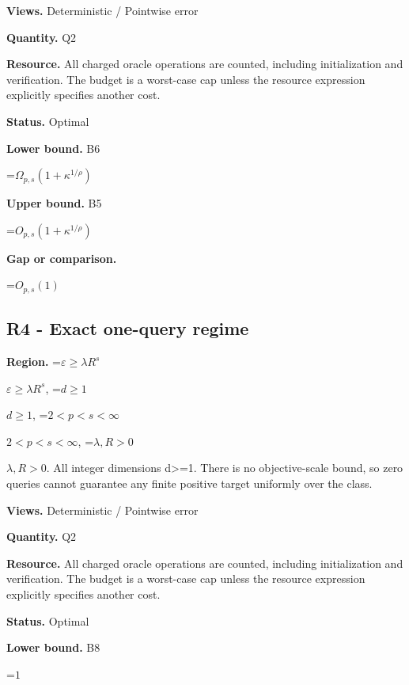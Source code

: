 \documentclass[10pt,a4paper]{article}
\newcommand{\AtlasMath}[1]{\par\begingroup\centering\setbox0=\hbox{$\displaystyle #1$}\ifdim\wd0>1.4\linewidth\typeout{ATLAS WIDE FORMULA: \the\wd0}\fi\ifdim\wd0>\linewidth\resizebox{\linewidth}{!}{\box0}\else\box0\fi\par\endgroup}
\newcommand{\AtlasInlineMath}[1]{\begingroup\setbox0=\hbox{$#1$}\ifdim\wd0>.4\linewidth\endgroup\AtlasMath{#1}\else\endgroup$#1$\fi}
\begin{document}
\textbf{Views.} Deterministic / Pointwise error



\textbf{Quantity.} Q2



\textbf{Resource.} All charged oracle operations are counted, including initialization and verification. The budget is a worst-case cap unless the resource expression explicitly specifies another cost.



\textbf{Status.} Optimal



\textbf{Lower bound.} B6



\AtlasMath{\Omega_{p,s}(1+\kappa^{1/\rho})}


\textbf{Upper bound.} B5



\AtlasMath{O_{p,s}(1+\kappa^{1/\rho})}


\textbf{Gap or comparison.}



\AtlasMath{O_{p,s}(1)}


\subsection{R4 - Exact one-query regime}


\textbf{Region.} \AtlasInlineMath{\varepsilon\ge\lambda R^s}, \AtlasInlineMath{d\ge1}, \AtlasInlineMath{2<p<s<\infty}, \AtlasInlineMath{\lambda,R>0}. All integer dimensions d>=1. There is no objective-scale bound, so zero queries cannot guarantee any finite positive target uniformly over the class.



\textbf{Views.} Deterministic / Pointwise error



\textbf{Quantity.} Q2



\textbf{Resource.} All charged oracle operations are counted, including initialization and verification. The budget is a worst-case cap unless the resource expression explicitly specifies another cost.



\textbf{Status.} Optimal



\textbf{Lower bound.} B8



\AtlasMath{1}
\end{document}
